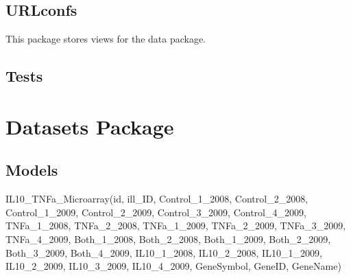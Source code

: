 \documentclass[letterpaper,10pt,english]{sphinxmanual}
\begin{document}
\subsection{URLconfs}
\label{api:urlconfs}\label{api:module-experimentdb.data.urls}
This package stores views for the data package.


\subsection{Tests}
\label{api:tests}

\section{Datasets Package}
\label{api:datasets-package}\label{api:module-experimentdb.datasets}

\subsection{Models}
\label{api:id1}\label{api:module-experimentdb.datasets.models}

\begin{fulllineitems}
\label{api:experimentdb.datasets.models.IL10_TNFa_Microarray}
IL10\_TNFa\_Microarray(id, ill\_ID, Control\_1\_2008, Control\_2\_2008, Control\_1\_2009, Control\_2\_2009, Control\_3\_2009, Control\_4\_2009, TNFa\_1\_2008, TNFa\_2\_2008, TNFa\_1\_2009, TNFa\_2\_2009, TNFa\_3\_2009, TNFa\_4\_2009, Both\_1\_2008, Both\_2\_2008, Both\_1\_2009, Both\_2\_2009, Both\_3\_2009, Both\_4\_2009, IL10\_1\_2008, IL10\_2\_2008, IL10\_1\_2009, IL10\_2\_2009, IL10\_3\_2009, IL10\_4\_2009, GeneSymbol, GeneID, GeneName)

\begin{fulllineitems}
\label{api:experimentdb.datasets.models.IL10_TNFa_Microarray.DoesNotExist}
\end{fulllineitems}


\begin{fulllineitems}
\label{api:experimentdb.datasets.models.IL10_TNFa_Microarray.MultipleObjectsReturned}
\end{fulllineitems}


\end{fulllineitems}
\end{document}
